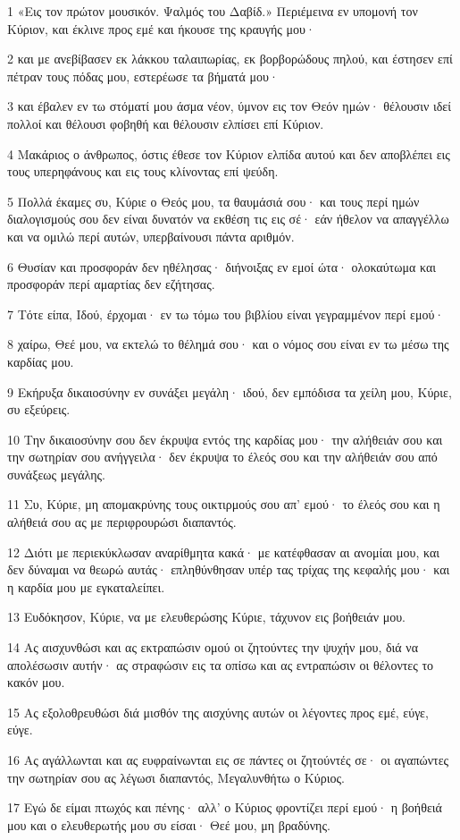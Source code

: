 \par 1 «Εις τον πρώτον μουσικόν. Ψαλμός του Δαβίδ.» Περιέμεινα εν υπομονή τον Κύριον, και έκλινε προς εμέ και ήκουσε της κραυγής μου·
\par 2 και με ανεβίβασεν εκ λάκκου ταλαιπωρίας, εκ βορβορώδους πηλού, και έστησεν επί πέτραν τους πόδας μου, εστερέωσε τα βήματά μου·
\par 3 και έβαλεν εν τω στόματί μου άσμα νέον, ύμνον εις τον Θεόν ημών· θέλουσιν ιδεί πολλοί και θέλουσι φοβηθή και θέλουσιν ελπίσει επί Κύριον.
\par 4 Μακάριος ο άνθρωπος, όστις έθεσε τον Κύριον ελπίδα αυτού και δεν αποβλέπει εις τους υπερηφάνους και εις τους κλίνοντας επί ψεύδη.
\par 5 Πολλά έκαμες συ, Κύριε ο Θεός μου, τα θαυμάσιά σου· και τους περί ημών διαλογισμούς σου δεν είναι δυνατόν να εκθέση τις εις σέ· εάν ήθελον να απαγγέλλω και να ομιλώ περί αυτών, υπερβαίνουσι πάντα αριθμόν.
\par 6 Θυσίαν και προσφοράν δεν ηθέλησας· διήνοιξας εν εμοί ώτα· ολοκαύτωμα και προσφοράν περί αμαρτίας δεν εζήτησας.
\par 7 Τότε είπα, Ιδού, έρχομαι· εν τω τόμω του βιβλίου είναι γεγραμμένον περί εμού·
\par 8 χαίρω, Θεέ μου, να εκτελώ το θέλημά σου· και ο νόμος σου είναι εν τω μέσω της καρδίας μου.
\par 9 Εκήρυξα δικαιοσύνην εν συνάξει μεγάλη· ιδού, δεν εμπόδισα τα χείλη μου, Κύριε, συ εξεύρεις.
\par 10 Την δικαιοσύνην σου δεν έκρυψα εντός της καρδίας μου· την αλήθειάν σου και την σωτηρίαν σου ανήγγειλα· δεν έκρυψα το έλεός σου και την αλήθειάν σου από συνάξεως μεγάλης.
\par 11 Συ, Κύριε, μη απομακρύνης τους οικτιρμούς σου απ' εμού· το έλεός σου και η αλήθειά σου ας με περιφρουρώσι διαπαντός.
\par 12 Διότι με περιεκύκλωσαν αναρίθμητα κακά· με κατέφθασαν αι ανομίαι μου, και δεν δύναμαι να θεωρώ αυτάς· επληθύνθησαν υπέρ τας τρίχας της κεφαλής μου· και η καρδία μου με εγκαταλείπει.
\par 13 Ευδόκησον, Κύριε, να με ελευθερώσης Κύριε, τάχυνον εις βοήθειάν μου.
\par 14 Ας αισχυνθώσι και ας εκτραπώσιν ομού οι ζητούντες την ψυχήν μου, διά να απολέσωσιν αυτήν· ας στραφώσιν εις τα οπίσω και ας εντραπώσιν οι θέλοντες το κακόν μου.
\par 15 Ας εξολοθρευθώσι διά μισθόν της αισχύνης αυτών οι λέγοντες προς εμέ, εύγε, εύγε.
\par 16 Ας αγάλλωνται και ας ευφραίνωνται εις σε πάντες οι ζητούντές σε· οι αγαπώντες την σωτηρίαν σου ας λέγωσι διαπαντός, Μεγαλυνθήτω ο Κύριος.
\par 17 Εγώ δε είμαι πτωχός και πένης· αλλ' ο Κύριος φροντίζει περί εμού· η βοήθειά μου και ο ελευθερωτής μου συ είσαι· Θεέ μου, μη βραδύνης.

